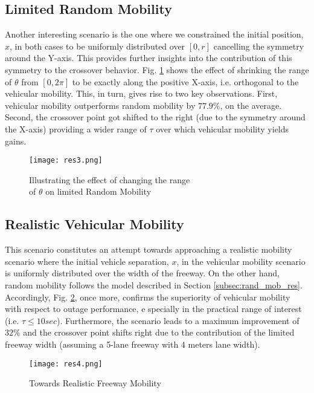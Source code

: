 \documentclass[conference,a4paper]{IEEEtran}
\begin{document}
\subsection{Limited Random Mobility}
Another interesting scenario is the one where we constrained the initial position, $x$, in both cases to be uniformly distributed over $[0,r]$ cancelling the symmetry around the Y-axis. This provides further insights into the contribution of this symmetry to the crossover behavior. Fig. \ref{Fig:lim_rand_around_x} shows the effect of shrinking the range of $\theta$ from $[0, 2\pi]$ to be exactly along the positive X-axis, i.e. orthogonal to the vehicular mobility. This, in turn, gives rise to two key observations. First, vehicular mobility outperforms random mobility by $77.9\%$, on the average. Second, the crossover point got shifted to the right (due to the symmetry around the X-axis) providing a wider range of $\tau$ over which vehicular mobility yields gains.
\begin{figure}[!t]
\centering
\texttt{[image: res3.png]}
\setlength{\abovecaptionskip}{-10pt}
\setlength{\belowcaptionskip}{-10pt}
\caption{Illustrating the effect of changing the range \\ of $\theta$ on limited Random Mobility}
\label{Fig:lim_rand_around_x}
\end{figure}


\subsection{Realistic Vehicular Mobility}
This scenario constitutes an attempt towards approaching a realistic mobility scenario where the initial vehicle separation, $x$, in the vehicular mobility scenario is uniformly distributed over the width of the freeway. On the other hand, random mobility follows the model described in Section \ref{subsec:rand_mob_res}. Accordingly, Fig. \ref{Fig:realistic}, once more, confirms the superiority of  vehicular mobility with respect to outage performance, e	specially in the practical range of interest (i.e. $\tau \le 10 sec$). Furthermore, the scenario leads to a maximum improvement of $32\%$ and the crossover point shifts right due to the contribution of the limited freeway width (assuming a 5-lane freeway with 4 meters lane width).
\begin{figure}[!t]
\centering
\texttt{[image: res4.png]}
\setlength{\abovecaptionskip}{-10pt}
\setlength{\belowcaptionskip}{-10pt}
\caption{Towards Realistic Freeway Mobility}
\label{Fig:realistic}
\end{figure}
\end{document}
